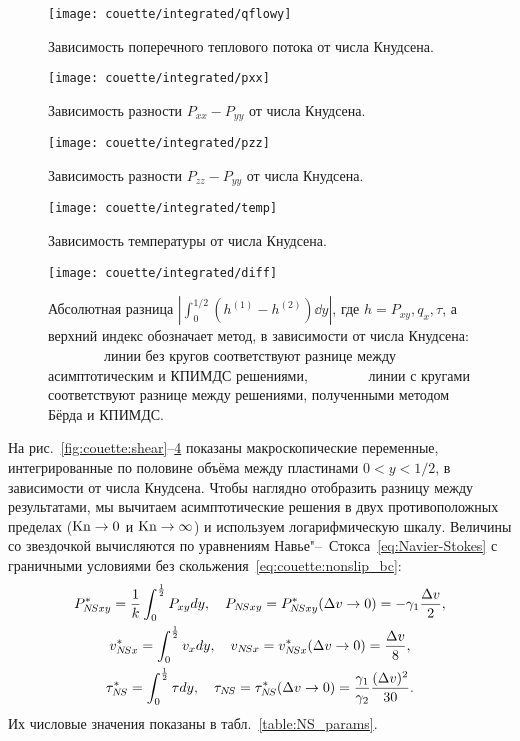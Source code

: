 \begin{figure}
    \centering
    \texttt{[image: couette/integrated/qflowy]}
    \caption{Зависимость поперечного теплового потока от числа Кнудсена.}
    \label{fig:couette:qflowy}
\end{figure}

\begin{figure}
    \centering
    \texttt{[image: couette/integrated/pxx]}
    \caption{Зависимость разности \(P_{xx}-P_{yy}\) от числа Кнудсена.}
    \label{fig:couette:pxx}
\end{figure}

\begin{figure}
    \centering
    \texttt{[image: couette/integrated/pzz]}
    \caption{Зависимость разности \(P_{zz}-P_{yy}\) от числа Кнудсена.}
    \label{fig:couette:pzz}
\end{figure}

\begin{figure}
    \centering
    \texttt{[image: couette/integrated/temp]}
    \caption{Зависимость температуры от числа Кнудсена.}
    \label{fig:couette:temp}
\end{figure}

\begin{figure}
    \centering
    \texttt{[image: couette/integrated/diff]}
    \caption{Абсолютная разница \(|\int_0^{1/2} (h^{(1)}-h^{(2)})\dd{y}|\),
        где \(h = P_{xy}, q_x, \tau\), а верхний индекс обозначает метод, в зависимости от числа Кнудсена:
        линии без кругов соответствуют разнице между асимптотическим и КПИМДС решениями,
        линии с кругами соответствуют разнице между решениями, полученными методом Бёрда и КПИМДС.}
    \label{fig:couette:diff}
\end{figure}

На рис.~\ref{fig:couette:shear}--\ref{fig:couette:temp} показаны макроскопические переменные,
интегрированные по половине объёма между пластинами \(0<y<1/2\), в зависимости от числа Кнудсена.
Чтобы наглядно отобразить разницу между результатами, мы вычитаем асимптотические решения
в двух противоположных пределах (\(\mathrm{Kn}\to0\) и \(\mathrm{Kn}\to\infty\)) и используем логарифмическую шкалу.
Величины со звездочкой вычисляются по уравнениям Навье"--~Стокса~\eqref{eq:Navier-Stokes}
с граничными условиями без скольжения~\eqref{eq:couette:nonslip_bc}:
\begin{gather*}
    P_{\NS xy}^* = \frac1k \int_0^\frac12 P_{xy} \dd{y}, \quad P_{\NS xy} = P_{\NS xy}^*(\Delta{v}\to0) = -\gamma_1\frac{\Delta{v}}2, \\
    v_{\NS x}^* = \int_0^\frac12 v_x \dd{y}, \quad v_{\NS x} = v_{\NS x}^*(\Delta{v}\to0) = \frac{\Delta{v}}8, \\
    \tau_{\NS}^* = \int_0^\frac12 \tau \dd{y}, \quad
        \tau_{\NS} = \tau_{\NS}^*(\Delta{v}\to0) = \frac{\gamma_1}{\gamma_2}\frac{(\Delta{v})^2}{30}.
\end{gather*}
Их числовые значения показаны в табл.~\ref{table:NS_params}.

